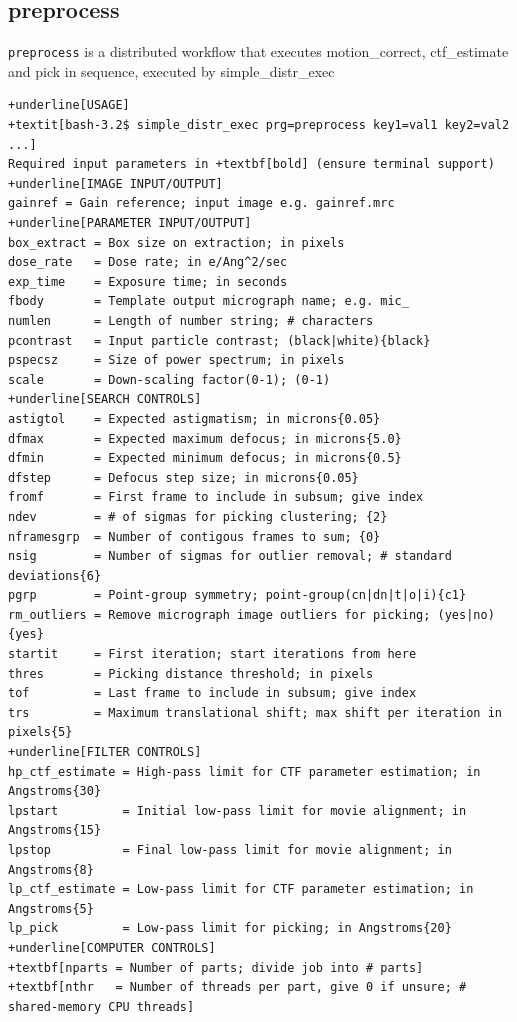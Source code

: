 \documentclass[a4paper,11pt]{article}
\newcommand{\prgname}[1]{\textcolor{NavyBlue}{\texttt{#1}}}
\begin{document}
\subsection{preprocess}
\label{preprocess}
\prgname{preprocess} is a distributed workflow that executes motion\_correct, ctf\_estimate and pick in sequence, executed by simple\_distr\_exec
\begin{Verbatim}[commandchars=+\[\],fontsize=\small,breaklines=true]
+underline[USAGE]
+textit[bash-3.2$ simple_distr_exec prg=preprocess key1=val1 key2=val2 ...]
Required input parameters in +textbf[bold] (ensure terminal support)
+underline[IMAGE INPUT/OUTPUT]
gainref = Gain reference; input image e.g. gainref.mrc
+underline[PARAMETER INPUT/OUTPUT]
box_extract = Box size on extraction; in pixels
dose_rate   = Dose rate; in e/Ang^2/sec
exp_time    = Exposure time; in seconds
fbody       = Template output micrograph name; e.g. mic_
numlen      = Length of number string; # characters
pcontrast   = Input particle contrast; (black|white){black}
pspecsz     = Size of power spectrum; in pixels
scale       = Down-scaling factor(0-1); (0-1)
+underline[SEARCH CONTROLS]
astigtol    = Expected astigmatism; in microns{0.05}
dfmax       = Expected maximum defocus; in microns{5.0}
dfmin       = Expected minimum defocus; in microns{0.5}
dfstep      = Defocus step size; in microns{0.05}
fromf       = First frame to include in subsum; give index
ndev        = # of sigmas for picking clustering; {2}
nframesgrp  = Number of contigous frames to sum; {0}
nsig        = Number of sigmas for outlier removal; # standard deviations{6}
pgrp        = Point-group symmetry; point-group(cn|dn|t|o|i){c1}
rm_outliers = Remove micrograph image outliers for picking; (yes|no){yes}
startit     = First iteration; start iterations from here
thres       = Picking distance threshold; in pixels
tof         = Last frame to include in subsum; give index
trs         = Maximum translational shift; max shift per iteration in pixels{5}
+underline[FILTER CONTROLS]
hp_ctf_estimate = High-pass limit for CTF parameter estimation; in Angstroms{30}
lpstart         = Initial low-pass limit for movie alignment; in Angstroms{15}
lpstop          = Final low-pass limit for movie alignment; in Angstroms{8}
lp_ctf_estimate = Low-pass limit for CTF parameter estimation; in Angstroms{5}
lp_pick         = Low-pass limit for picking; in Angstroms{20}
+underline[COMPUTER CONTROLS]
+textbf[nparts = Number of parts; divide job into # parts]
+textbf[nthr   = Number of threads per part, give 0 if unsure; # shared-memory CPU threads]
\end{Verbatim}
\end{document}
